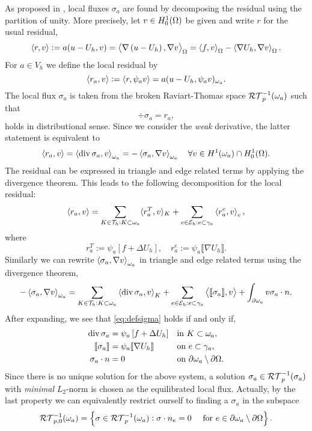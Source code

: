 \documentclass[thesis.tex]{subfiles}
\begin{document}
As proposed  in \cite{braessequilrobust}, local fluxes $\sigma_a$ are found by decomposing the residual using the partition of unity. 
More precisely, let $v \in H_0^1(\Omega)$ be given and write $r$ for the usual residual, 
\[
  \left \langle r,v \right \rangle := a(u - U_h, v) = \left \langle \nabla \left(u - U_h\right), \nabla v \right \rangle_\Omega = \left \langle f,v \right \rangle_\Omega - \left \langle \nabla U_h,\nabla v \right \rangle_\Omega.
\]
For $a \in V_h$ we define the local residual by
\[
  \left \langle r_a,v \right \rangle := \left \langle r,\psi_a v \right \rangle = a(u - U_h, \psi_a v)_{\omega_a}.
\]
The local flux $\sigma_a$ is taken from the broken Raviart-Thomas space $\mathcal{RT}_{p}^{-1}(\omega_a)$ such that
\begin{equation}
  \label{eq:defsigma}
\div \sigma_a = r_a,
\end{equation}
holds in distributional sense. Since we consider the \emph{weak} derivative, the latter
statement is equivalent to
\begin{equation}
  \label{eq:defsigma}
  \left \langle r_a, v \right \rangle = \left \langle \operatorname{div} \sigma_a, v \right \rangle_{\omega_a} = - \left \langle \sigma_a, \nabla v \right \rangle_{\omega_a} \quad \forall v \in H^1(\omega_a) \cap H_0^1(\Omega).
\end{equation}
The residual can be expressed in triangle and edge related terms by applying the divergence theorem.
This leads to the following decomposition for the local residual:
\begin{equation}
  \label{eq:locdecomp}
  \left \langle r_a,v \right \rangle = \sum_{K \in \mathcal{T}_h : K\subset \omega_a} \langle{r^T_a, v}\rangle_K + \sum_{e \in \mathcal{E}_h: e \subset \gamma_a} \left \langle r^e_a, v \right \rangle_e,
\end{equation}
where 
\[
  r^T_a := \psi_a \left[ f + \Delta U_h \right], \quad r^e_a := \psi_a \llbracket \nabla U_h \rrbracket.
\]
Similarly we can rewrite $\left \langle \sigma_a, \nabla v \right \rangle_{\omega_a}$ in triangle and edge related terms using the divergence theorem,
\[
  -\left \langle \sigma_a, \nabla v \right \rangle_{\omega_a} = \sum_{K \in \mathcal{T}_h : K \subset \omega_a} \left \langle \operatorname{div} \sigma_a, v \right \rangle_K + \sum_{e \in \mathcal{E}_h : e\subset \gamma_a} \left \langle \llbracket \sigma_a\rrbracket, v \right \rangle + \int_{\partial \omega_a} v \sigma_a \cdot n.
\]
After expanding, we see that \eqref{eq:defsigma} holds if and only if,
\begin{equation}
  \label{eq:sigmacons}
  \begin{alignedat}{3}
    \operatorname{div} \sigma_a &= \psi_a \left [f + \Delta U_h\right] && \quad\text{in }  K\subset \omega_a ,\\
    \llbracket \sigma_a \rrbracket &= \psi_a \llbracket \nabla U_h \rrbracket && \quad \text{on } e \subset \gamma_a,\\
    \sigma_a \cdot n &= 0 &&\quad \text{on } \partial \omega_a \setminus \partial \Omega.
  \end{alignedat}
\end{equation}
Since there is no unique solution for the above system, a solution $\sigma_a \in \mathcal{RT}_p^{-1}(\sigma_a)$
with \emph{minimal} $L_2$-norm is chosen as the equilibrated local flux. Actually, by the last
property we can equivalently restrict ourself to finding a $\sigma_a$ in the subspace
\[
  \mathcal{RT}_{p,0}^{-1}(\omega_a) = \set{ \sigma \in \mathcal{RT}_p^{-1}(\omega_a) : \sigma \cdot n_e = 0 \quad \text{ for } e \in \partial \omega_a \setminus \partial \Omega}.
\]
\end{document}
